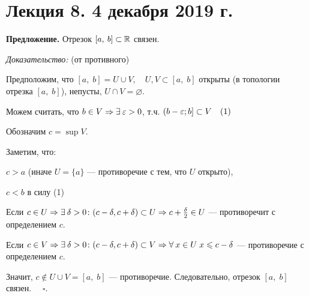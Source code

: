 \documentclass[../../main.tex]{subfiles}
\begin{document}
\section{Лекция 8. 4 декабря 2019 г.}

\textbf{Предложение.} Отрезок $[a,\: b] \subset \mathbb{R}$ связен.

\textit{Доказательство:} (от противного)

Предположим, что $[a,\; b] = U \cup V,\quad U, V \subset [a,\; b]$ открыты (в топологии отрезка $[a,\; b]$), непусты, $U \cap V = \varnothing$.

\vspace{9pt}

\begin{minipage}{0.8\linewidth}

Можем считать, что $b \in V \Rightarrow \exists\: \varepsilon > 0$, т.ч. $(b - \varepsilon; b] \subset V \quad (1)$

Обозначим $c = \sup V$. 

Заметим, что:

$c > a$ (иначе $U = \{ a\}$ — противоречие с тем, что $U$ открыто),

$c < b$ в силу (1)

Если $c \in U \Rightarrow \exists\: \delta > 0 \colon (c - \delta, c + \delta) \subset U \Rightarrow c + \frac \delta 2 \in U$ — противоречит с определением $c$.

Если $c \in V \Rightarrow \exists\: \delta > 0 \colon (c - \delta, c + \delta) \subset V \Rightarrow \forall\: x \in U \; x \leqslant c - \delta$ — противоречие с определением $c$.

Значит, $c \notin U \cup V = [a,\; b]$ — противоречие. Следовательно, отрезок $[a,\;b]$ связен. $\quad \square$.
\end{minipage}
\begin{minipage}{0.2\linewidth}
\end{minipage}
\end{document}

